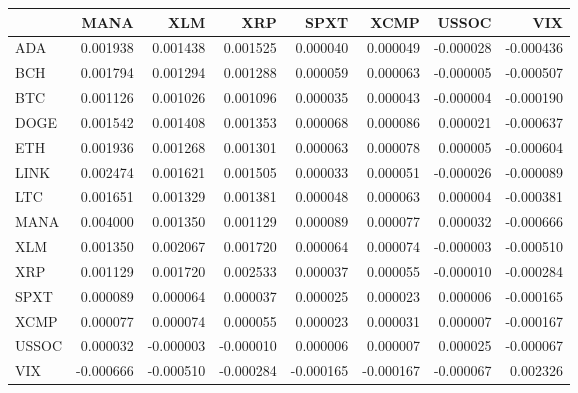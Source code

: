 \begin{tabular}{lrrrrrrr}
\toprule
 & MANA & XLM & XRP & SPXT & XCMP & USSOC & VIX \\
\midrule
ADA & 0.001938 & 0.001438 & 0.001525 & 0.000040 & 0.000049 & -0.000028 & -0.000436 \\
BCH & 0.001794 & 0.001294 & 0.001288 & 0.000059 & 0.000063 & -0.000005 & -0.000507 \\
BTC & 0.001126 & 0.001026 & 0.001096 & 0.000035 & 0.000043 & -0.000004 & -0.000190 \\
DOGE & 0.001542 & 0.001408 & 0.001353 & 0.000068 & 0.000086 & 0.000021 & -0.000637 \\
ETH & 0.001936 & 0.001268 & 0.001301 & 0.000063 & 0.000078 & 0.000005 & -0.000604 \\
LINK & 0.002474 & 0.001621 & 0.001505 & 0.000033 & 0.000051 & -0.000026 & -0.000089 \\
LTC & 0.001651 & 0.001329 & 0.001381 & 0.000048 & 0.000063 & 0.000004 & -0.000381 \\
MANA & 0.004000 & 0.001350 & 0.001129 & 0.000089 & 0.000077 & 0.000032 & -0.000666 \\
XLM & 0.001350 & 0.002067 & 0.001720 & 0.000064 & 0.000074 & -0.000003 & -0.000510 \\
XRP & 0.001129 & 0.001720 & 0.002533 & 0.000037 & 0.000055 & -0.000010 & -0.000284 \\
SPXT & 0.000089 & 0.000064 & 0.000037 & 0.000025 & 0.000023 & 0.000006 & -0.000165 \\
XCMP & 0.000077 & 0.000074 & 0.000055 & 0.000023 & 0.000031 & 0.000007 & -0.000167 \\
USSOC & 0.000032 & -0.000003 & -0.000010 & 0.000006 & 0.000007 & 0.000025 & -0.000067 \\
VIX & -0.000666 & -0.000510 & -0.000284 & -0.000165 & -0.000167 & -0.000067 & 0.002326 \\
\bottomrule
\end{tabular}
